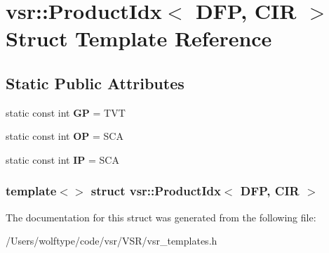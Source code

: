 \hypertarget{structvsr_1_1_product_idx_3_01_d_f_p_00_01_c_i_r_01_4}{\section{vsr\-:\-:Product\-Idx$<$ D\-F\-P, C\-I\-R $>$ Struct Template Reference}
\label{structvsr_1_1_product_idx_3_01_d_f_p_00_01_c_i_r_01_4}
}
\subsection*{Static Public Attributes}
\begin{DoxyCompactItemize}
\item 
\hypertarget{structvsr_1_1_product_idx_3_01_d_f_p_00_01_c_i_r_01_4_a8e8dc67dff172fc47fb33de9e376fe81}{static const int {\bfseries G\-P} = T\-V\-T}\label{structvsr_1_1_product_idx_3_01_d_f_p_00_01_c_i_r_01_4_a8e8dc67dff172fc47fb33de9e376fe81}

\item 
\hypertarget{structvsr_1_1_product_idx_3_01_d_f_p_00_01_c_i_r_01_4_a87291c145746cab3c251fd4cf3211a12}{static const int {\bfseries O\-P} = S\-C\-A}\label{structvsr_1_1_product_idx_3_01_d_f_p_00_01_c_i_r_01_4_a87291c145746cab3c251fd4cf3211a12}

\item 
\hypertarget{structvsr_1_1_product_idx_3_01_d_f_p_00_01_c_i_r_01_4_a57562227c2e135fdf00faafd7f01aa3b}{static const int {\bfseries I\-P} = S\-C\-A}\label{structvsr_1_1_product_idx_3_01_d_f_p_00_01_c_i_r_01_4_a57562227c2e135fdf00faafd7f01aa3b}

\end{DoxyCompactItemize}
\subsubsection*{template$<$$>$ struct vsr\-::\-Product\-Idx$<$ D\-F\-P, C\-I\-R $>$}



The documentation for this struct was generated from the following file\-:\begin{DoxyCompactItemize}
\item 
/\-Users/wolftype/code/vsr/\-V\-S\-R/vsr\-\_\-templates.\-h\end{DoxyCompactItemize}
